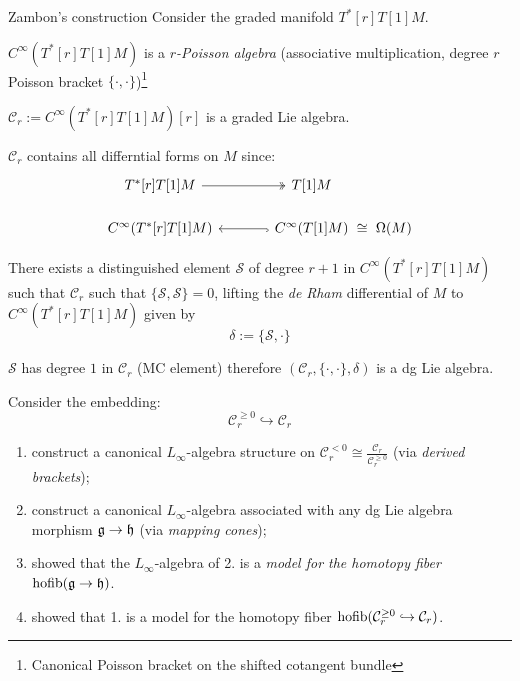 \documentclass[beamer,10pt]{standalone}
\begin{document}


\begin{frame}{Zambon's construction}
	Consider the graded manifold $T^*[r]T[1]M$.
	\vfill

	$C^\infty(T^*[r]T[1]M)$ is a \emph{$r$-Poisson algebra} (associative multiplication, degree $r$ Poisson bracket $\lbrace \cdot,\cdot\rbrace$)\footnote{Canonical Poisson bracket on the shifted cotangent bundle}
	\vfill

	$\mathcal{C}_r := C^\infty(T^*[r]T[1]M)[r]$ is a graded Lie algebra.
	\vfill

	$\mathcal{C}_r$ contains all differntial forms on $M$ since:
	\begin{displaymath}
		\begin{tikzcd}[ampersand replacement=\&,column sep = large]
			T^*[r]T[1]M \ar[r, two heads,] \& T[1]M \&[-2.5em] \\[-.5em]
			C^\infty(T^*[r]T[1]M) \& C^\infty(T[1]M) \ar[l,hook]\ar[r,phantom,"\cong"] \& \Omega(M) 
 		\end{tikzcd}
	\end{displaymath}
\end{frame}

\begin{frame}
	There exists a distinguished element $\mathcal{S}$ of degree $r+1$ in $C^\infty(T^*[r]T[1]M)$ such that $\mathcal{C}_r$ such that $\lbrace \mathcal{S},\mathcal{S}\rbrace =0 $, lifting the \emph{de Rham} differential of $M$ to $C^\infty(T^*[r]T[1]M)$ given by 
	$$ \delta := \lbrace \mathcal{S},\cdot \rbrace$$
	\vfill

	$\mathcal{S}$ has degree $1$ in $\mathcal{C}_r$ (MC element) therefore $(\mathcal{C}_r,\lbrace \cdot,\cdot\rbrace,\delta)$ is a dg Lie algebra.
	\vfill

	Consider the embedding: $$ \mathcal{C}_r^{\geq 0} \hookrightarrow \mathcal{C}_r$$
	\begin{enumerate}
		\item \cite{Getzler1991} construct a canonical $L_\infty$-algebra structure on $\mathcal{C}_r^{<0}\cong \frac{\mathcal{C}_r }{\mathcal{C}_r^{\geq 0}}$ (via \emph{derived brackets});
		\item \cite{Fiorenza2006} construct a canonical $L_\infty$-algebra associated with any dg Lie algebra morphism $\mathfrak{g} \to \mathfrak{h}$ (via \emph{mapping cones});
		\item \cite{Pridham2010a} showed that the $L_\infty$-algebra  of 2. is a \emph{model for the homotopy fiber $\mathrm{hofib}(\mathfrak{g} \to \mathfrak{h})$}.
		\item \cite{Bandiera2015} showed that 1. is a model for the homotopy fiber $\mathrm{hofib}(\mathcal{C}_r^{\geq 0} \hookrightarrow \mathcal{C}_r)$.
	\end{enumerate}
\end{frame}
\end{document}
